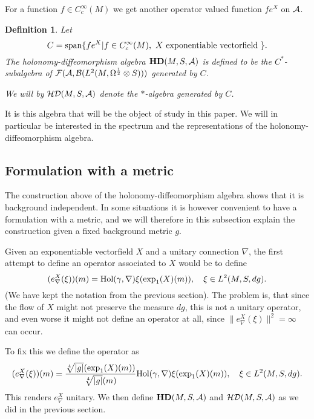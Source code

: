 \documentclass[12pt]{article}
\def\ca{{\cal A}}
\def\cb{{\cal B}}
\def\cd{{\cal D}}
\def\cf{{\cal F}}
\def\ch{{\cal H}}
\newtheorem{definition}[thm]{Definition}
\begin{document}
For a function $f\in C^\infty_c (M)$ we get another operator valued function $fe^X$ on $\ca$. 



\begin{definition}
Let 
$$C =   \hbox{span} \{ fe^X |f\in C^\infty_c(M), \ X \hbox{ exponentiable vectorfield }\}  . $$
The holonomy-diffeomorphism algebra $\mathbf{H D} (M,S,\ca)   $ is defined to be the $C^*$-subalgebra of  $\cf (\ca , \cb (L^2(M,\Omega^{\frac12}\otimes S)) )$ generated by $C$.


We will by $\ch \cd (M,S,\ca)   $ denote the  $*$-algebra generated by $C$.
\end{definition}

It is this algebra that will be the object of study in this paper. We will in particular be interested in the spectrum and the representations of the holonomy-diffeomorphism algebra.




\subsection{Formulation with a metric}

The construction above of the holonomy-diffeomorphism algebra shows that it is background independent.  In some situations it is however convenient to have a formulation with a metric, and we will therefore in this subsection explain the construction given a fixed background metric $g$. 

Given an exponentiable vectorfield $X$ and a unitary connection $\nabla$, the first attempt to define an operator associated to $X$ would be to define
$$(e^X_\nabla ( \xi))( m)= \hbox{Hol} (\gamma , \nabla ) \xi ( \exp_1(X)(m)) ,\quad \xi \in L^2(M,S,dg)     .$$ 
(We have kept the notation from the previous section). The problem is, that since the flow of $X$ might not preserve the measure $dg$, this is not a unitary operator, and even worse it might not define an operator at all, since
$\| e^X_\nabla ( \xi )\|^2=\infty $ can occur.

To fix this we define the operator as
$$(e^X_\nabla ( \xi))( m)= \frac{\sqrt[4]{|g|} (\exp_1(X) (m))}{\sqrt[4]{|g|} (m)} \hbox{Hol} (\gamma , \nabla ) \xi ( \exp_1(X)(m)) ,\quad \xi \in L^2(M,S,dg)     .$$ 
This renders $e^X_\nabla$ unitary. We then define $\mathbf{HD}(M,S,\ca)$ and $\mathcal{HD}(M,S,\ca)$ as we did in the previous section.
\end{document}
